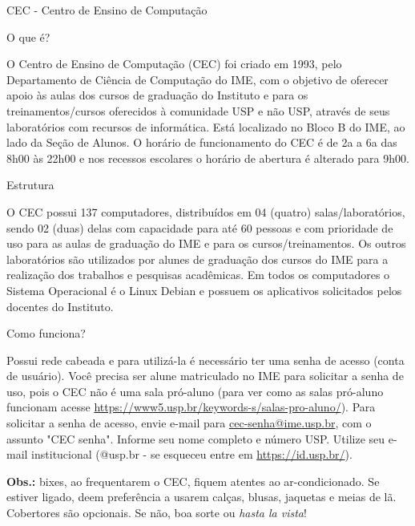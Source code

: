 \begin{secao}{CEC - Centro de Ensino de Computação}

\begin{subsecao}{O que é?}

O Centro de Ensino de Computação (CEC) foi criado em 1993, pelo
Departamento de Ciência de Computação do IME, com o objetivo de
oferecer apoio às aulas dos cursos de graduação do Instituto e para os
treinamentos/cursos oferecidos à comunidade USP e não USP, através de
seus laboratórios com recursos de informática.
Está localizado no Bloco B do IME, ao lado da Seção de Alunos. O horário
de funcionamento do CEC é de 2a a 6a das 8h00 às 22h00 e nos recessos
escolares o horário de abertura é alterado para 9h00.

\end{subsecao}

\begin{subsecao}{Estrutura}

O CEC possui 137 computadores, distribuídos em 04 (quatro) salas/laboratórios,
sendo 02 (duas) delas com capacidade para até 60 pessoas e com prioridade de uso
para as aulas de graduação do IME e para os cursos/treinamentos. Os outros
laboratórios são utilizados por alunes de graduação dos cursos do IME para a
realização dos trabalhos e pesquisas acadêmicas. Em todos os computadores o Sistema
Operacional é o Linux Debian e possuem os aplicativos solicitados pelos docentes
do Instituto.

\end{subsecao}

\begin{subsecao}{Como funciona?}

Possui rede cabeada e para utilizá-la é necessário ter uma senha de
acesso (conta de usuário). Você precisa ser alune matriculado no IME para
solicitar a senha de uso, pois o CEC não é uma sala pró-aluno (para ver como as 
salas pró-aluno funcionam acesse \url{https://www5.usp.br/keywords-s/salas-pro-aluno/}). 
Para solicitar a senha de acesso, envie e-mail para \url{cec-senha@ime.usp.br},
com o assunto "CEC senha". Informe seu nome completo e número USP. Utilize
seu e-mail institucional (@usp.br - se esqueceu entre em
\url{https://id.usp.br/}).

\end{subsecao}

\textbf{Obs.:} bixes, ao frequentarem o CEC, fiquem atentes ao ar-condicionado. Se
estiver ligado, deem preferência a usarem calças, blusas, jaquetas e meias de
lã. Cobertores são opcionais. Se não, boa sorte ou \textit{hasta la vista}!

\end{secao}
